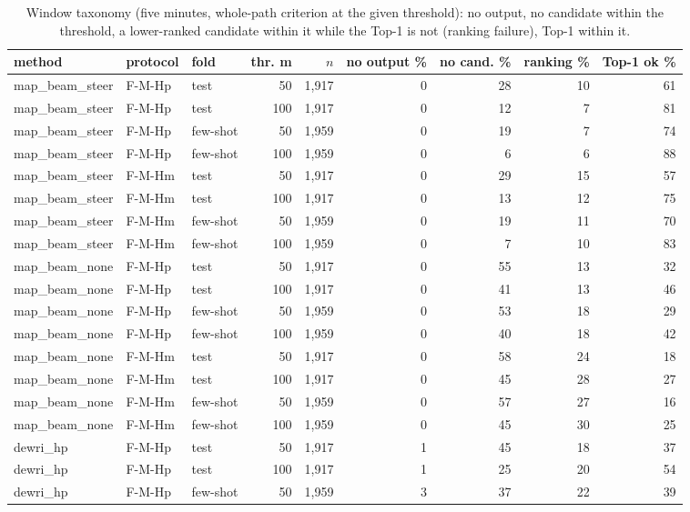 \begin{table}[t]\centering\scriptsize\setlength{\tabcolsep}{3pt}
\caption{Window taxonomy (five minutes, whole-path criterion at the given threshold): no output, no candidate within the threshold, a lower-ranked candidate within it while the Top-1 is not (ranking failure), Top-1 within it.}\label{tab:supp_tax}
\begin{tabular}{lllrrrrrr}\toprule
method & protocol & fold & thr. m & $n$ & no output \% & no cand. \% & ranking \% & Top-1 ok \% \\\midrule
map\_beam\_steer & F-M-Hp & test & 50 & 1{,}917 & 0 & 28 & 10 & 61 \\
map\_beam\_steer & F-M-Hp & test & 100 & 1{,}917 & 0 & 12 & 7 & 81 \\
map\_beam\_steer & F-M-Hp & few-shot & 50 & 1{,}959 & 0 & 19 & 7 & 74 \\
map\_beam\_steer & F-M-Hp & few-shot & 100 & 1{,}959 & 0 & 6 & 6 & 88 \\
map\_beam\_steer & F-M-Hm & test & 50 & 1{,}917 & 0 & 29 & 15 & 57 \\
map\_beam\_steer & F-M-Hm & test & 100 & 1{,}917 & 0 & 13 & 12 & 75 \\
map\_beam\_steer & F-M-Hm & few-shot & 50 & 1{,}959 & 0 & 19 & 11 & 70 \\
map\_beam\_steer & F-M-Hm & few-shot & 100 & 1{,}959 & 0 & 7 & 10 & 83 \\
map\_beam\_none & F-M-Hp & test & 50 & 1{,}917 & 0 & 55 & 13 & 32 \\
map\_beam\_none & F-M-Hp & test & 100 & 1{,}917 & 0 & 41 & 13 & 46 \\
map\_beam\_none & F-M-Hp & few-shot & 50 & 1{,}959 & 0 & 53 & 18 & 29 \\
map\_beam\_none & F-M-Hp & few-shot & 100 & 1{,}959 & 0 & 40 & 18 & 42 \\
map\_beam\_none & F-M-Hm & test & 50 & 1{,}917 & 0 & 58 & 24 & 18 \\
map\_beam\_none & F-M-Hm & test & 100 & 1{,}917 & 0 & 45 & 28 & 27 \\
map\_beam\_none & F-M-Hm & few-shot & 50 & 1{,}959 & 0 & 57 & 27 & 16 \\
map\_beam\_none & F-M-Hm & few-shot & 100 & 1{,}959 & 0 & 45 & 30 & 25 \\
dewri\_hp & F-M-Hp & test & 50 & 1{,}917 & 1 & 45 & 18 & 37 \\
dewri\_hp & F-M-Hp & test & 100 & 1{,}917 & 1 & 25 & 20 & 54 \\
dewri\_hp & F-M-Hp & few-shot & 50 & 1{,}959 & 3 & 37 & 22 & 39 \\

\end{tabular}
\end{table}
